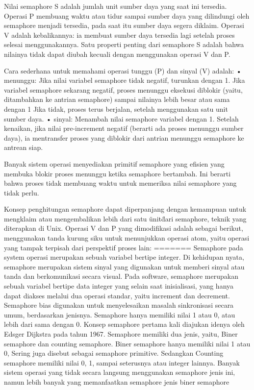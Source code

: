 Nilai semaphore S adalah jumlah unit sumber daya yang saat ini tersedia. Operasi P membuang waktu atau tidur sampai sumber daya yang dilindungi oleh semaphore 
menjadi tersedia, pada saat itu sumber daya segera diklaim. Operasi V adalah kebalikannya: ia membuat sumber daya tersedia lagi setelah proses selesai 
menggunakannya. Satu properti penting dari semaphore S adalah bahwa nilainya tidak dapat diubah kecuali dengan menggunakan operasi V dan P.

Cara sederhana untuk memahami operasi tunggu (P) dan sinyal (V) adalah:
• menunggu: Jika nilai variabel semaphore tidak negatif, turunkan dengan 1. Jika variabel semaphore sekarang negatif, proses menunggu eksekusi diblokir 
(yaitu, ditambahkan ke antrian semaphore) sampai nilainya lebih besar atau sama dengan 1 Jika tidak, proses terus berjalan, setelah menggunakan satu unit 
sumber daya.
• sinyal: Menambah nilai semaphore variabel dengan 1. Setelah kenaikan, jika nilai pre-increment negatif (berarti ada proses menunggu sumber daya), ia 
mentransfer proses yang diblokir dari antrian menunggu semaphore ke antrean siap.

Banyak sistem operasi menyediakan primitif semaphore yang efisien yang membuka blokir proses menunggu ketika semaphore bertambah. Ini berarti bahwa proses 
tidak membuang waktu untuk memeriksa nilai semaphore yang tidak perlu.

Konsep penghitungan semaphore dapat diperpanjang dengan kemampuan untuk mengklaim atau mengembalikan lebih dari satu \"unit\" dari semaphore, teknik yang 
diterapkan di Unix. Operasi V dan P yang dimodifikasi adalah sebagai berikut, menggunakan tanda kurung siku untuk menunjukkan operasi atom, yaitu operasi 
yang tampak terpisah dari perspektif proses lain:
=======
Semaphore pada system operasi merupakan sebuah variabel bertipe integer. Di kehidupan nyata, semaphore merupakan sistem sinyal 		yang digunakan untuk memberi sinyal atau tanda dan berkomunikasi secara visual. Pada software, semaphore merupakan sebuah variabel bertipe data integer yang selain saat inisialisasi, yang hanya dapat diakses melalui dua operasi standar, yaitu increment dan decrement.
Semaphore bias digunakan untuk menyelesaikan masalah sinkronisasi secara umum, berdasarkan jenisnya. Semaphore hanya memiliki nilai 1 atau 0, atau lebih dari sama dengan 0. Konsep semaphore pertama kali diajukan idenya oleh Edsger Dijkstra pada tahun 1967. Semaphore memiliki dua jenis, yaitu, Biner semaphore dan counting semaphore. Biner semaphore hanya memiliki nilai 1 atau 0, Sering juga disebut sebagai semaphore primitive. Sedangkan Counting semaphore memiliki nilai 0, 1, sampai seterusnya atau integer lainnya. Banyak sistem operasi yang tidak secara langsung menggunakan semaphore jenis ini, namun lebih banyak yang memanfaatkan semaphore jenis biner semaphore
	
